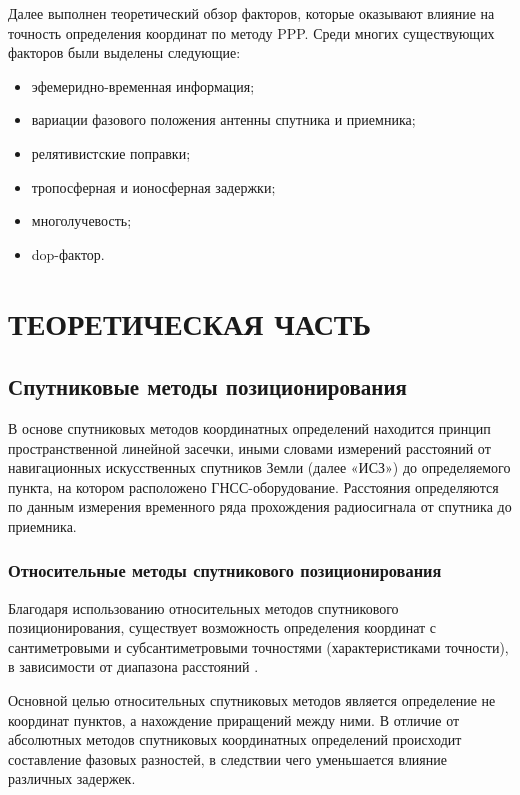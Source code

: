 Далее выполнен теоретический обзор факторов, которые оказывают влияние на точность определения координат по методу PPP. Среди многих существующих факторов были выделены следующие: 
\begin{itemize}
	\item эфемеридно-временная информация; 
	\item вариации фазового положения антенны спутника и приемника; 
	\item релятивистские поправки; 
	\item тропосферная и ионосферная задержки; 
	\item многолучевость; 
	\item dop-фактор.
\end{itemize}




\else %
\chapter{ТЕОРЕТИЧЕСКАЯ ЧАСТЬ}\label{ch:ch1}

\section{Спутниковые методы позиционирования }\label{sec:ch1/sec1}


В основе спутниковых методов координатных определений находится принцип пространственной линейной засечки, иными словами измерений расстояний от навигационных искусственных спутников Земли (далее «ИСЗ») до определяемого пункта, на котором расположено ГНСС-оборудование.  Расстояния определяются по данным измерения временного ряда прохождения радиосигнала от спутника до приемника.

\subsection{Относительные методы спутникового позиционирования}\label{subsec:ch1/sec1/sub1}

Благодаря использованию относительных методов спутникового позиционирования, существует возможность определения координат с сантиметровыми и субсантиметровыми точностями (характеристиками точности), в зависимости от диапазона расстояний \cite{src01,src09}.

Основной целью относительных спутниковых методов является определение не координат пунктов, а нахождение приращений между ними. В отличие от абсолютных методов спутниковых координатных определений происходит составление фазовых разностей, в следствии чего уменьшается влияние различных задержек.


